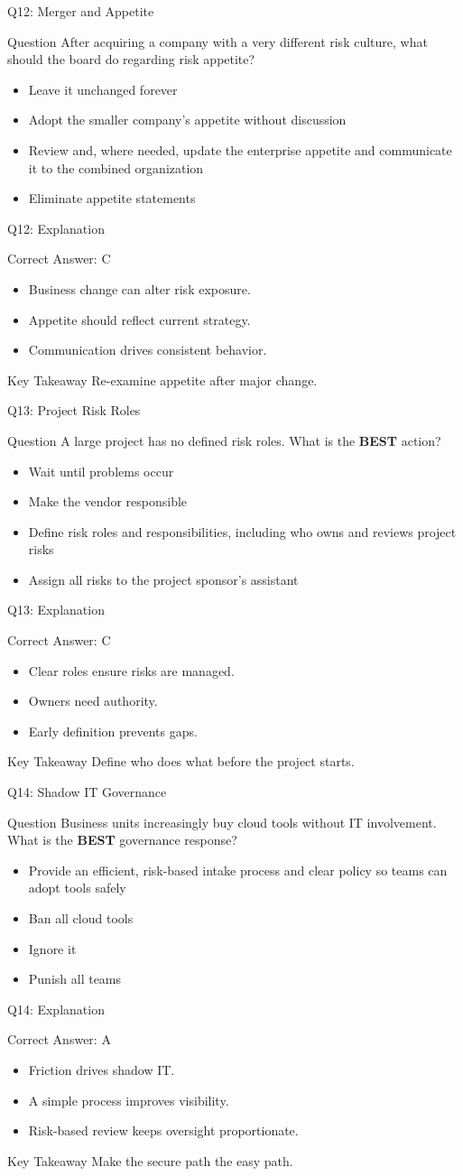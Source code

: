 \documentclass[aspectratio=169]{beamer}
\newcommand{\hq}[7]{%
	\begin{frame}{Q#1: #2}
		\begin{block}{Question}
			#3
		\end{block}
		\begin{itemize}
			#4
		\end{itemize}
	\end{frame}
	\begin{frame}{Q#1: Explanation}
		\begin{block}{Correct Answer: #5}
			\begin{itemize}
				#6
			\end{itemize}
		\end{block}
		\begin{alertblock}{Key Takeaway}
			#7
		\end{alertblock}
	\end{frame}
}
\begin{document}
	\hq{12}{Merger and Appetite}
	{After acquiring a company with a very different risk culture, what should the board do regarding risk appetite?}
	{\item[\textbf{(A)}] Leave it unchanged forever
		\item[\textbf{(B)}] Adopt the smaller company's appetite without discussion
		\item[\textbf{(C)}] Review and, where needed, update the enterprise appetite and communicate it to the combined organization
		\item[\textbf{(D)}] Eliminate appetite statements}
	{C}
	{\item Business change can alter risk exposure.
		\item Appetite should reflect current strategy.
		\item Communication drives consistent behavior.}
	{Re-examine appetite after major change.}
	
	\hq{13}{Project Risk Roles}
	{A large project has no defined risk roles. What is the \textbf{BEST} action?}
	{\item[\textbf{(A)}] Wait until problems occur
		\item[\textbf{(B)}] Make the vendor responsible
		\item[\textbf{(C)}] Define risk roles and responsibilities, including who owns and reviews project risks
		\item[\textbf{(D)}] Assign all risks to the project sponsor's assistant}
	{C}
	{\item Clear roles ensure risks are managed.
		\item Owners need authority.
		\item Early definition prevents gaps.}
	{Define who does what before the project starts.}
	
	\hq{14}{Shadow IT Governance}
	{Business units increasingly buy cloud tools without IT involvement. What is the \textbf{BEST} governance response?}
	{\item[\textbf{(A)}] Provide an efficient, risk-based intake process and clear policy so teams can adopt tools safely
		\item[\textbf{(B)}] Ban all cloud tools
		\item[\textbf{(C)}] Ignore it
		\item[\textbf{(D)}] Punish all teams}
	{A}
	{\item Friction drives shadow IT.
		\item A simple process improves visibility.
		\item Risk-based review keeps oversight proportionate.}
	{Make the secure path the easy path.}
	
\end{document}
